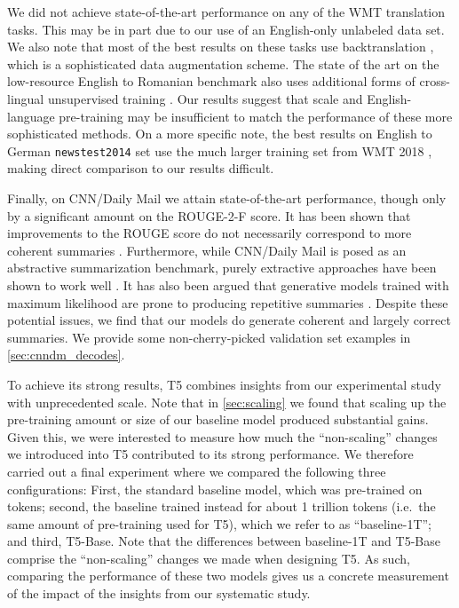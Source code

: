 \documentclass[twoside,11pt]{article}
\begin{document}
We did not achieve state-of-the-art performance on any of the WMT translation tasks.
This may be in part due to our use of an English-only unlabeled data set.
We also note that most of the best results on these tasks use backtranslation \citep{edunov2018understanding,lample2019cross}, which is a sophisticated data augmentation scheme.
The state of the art on the low-resource English to Romanian benchmark also uses additional forms of cross-lingual unsupervised training \citep{lample2019cross}.
Our results suggest that scale and English-language pre-training may be insufficient to match the performance of these more sophisticated methods.
On a more specific note, the best results on English to German \texttt{newstest2014} set use the much larger training set from WMT 2018 \citep{edunov2018understanding}, making direct comparison to our results difficult.

Finally, on CNN/Daily Mail we attain state-of-the-art performance, though only by a significant amount on the ROUGE-2-F score.
It has been shown that improvements to the ROUGE score do not necessarily correspond to more coherent summaries \citep{paulus2017deep}.
Furthermore, while CNN/Daily Mail is posed as an abstractive summarization benchmark, purely extractive approaches have been shown to work well \citep{liu2019fine}.
It has also been argued that generative models trained with maximum likelihood are prone to producing repetitive summaries \citep{see2017get}.
Despite these potential issues, we find that our models do generate coherent and largely correct summaries.
We provide some non-cherry-picked validation set examples in \cref{sec:cnndm_decodes}.

To achieve its strong results, T5 combines insights from our experimental study with unprecedented scale.
Note that in \cref{sec:scaling} we found that scaling up the pre-training amount or size of our baseline model produced substantial gains.
Given this, we were interested to measure how much the ``non-scaling'' changes we introduced into T5 contributed to its strong performance.
We therefore carried out a final experiment where we compared the following three configurations:
First, the standard baseline model, which was pre-trained on  tokens;
second, the baseline trained instead for about 1 trillion tokens (i.e.\ the same amount of pre-training used for T5), which we refer to as ``baseline-1T'';
and third, T5-Base.
Note that the differences between baseline-1T and T5-Base comprise the ``non-scaling'' changes we made when designing T5.
As such, comparing the performance of these two models gives us a concrete measurement of the impact of the insights from our systematic study.
\end{document}
